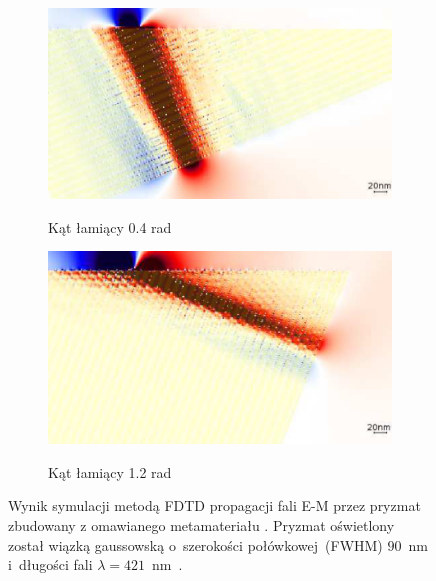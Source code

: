 \begin{figure}[btH]
	\centering
			\begin{subfigure}{0.45\textwidth}
				\includegraphics[width=\textwidth]{images/multilayer/prism04.png} \\
				\caption{Kąt łamiący 0.4 rad}
			\end{subfigure}
			\begin{subfigure}{0.45\textwidth}
				\includegraphics[width=\textwidth]{images/multilayer/prism12.png}\\
				\caption{Kąt łamiący 1.2 rad}
			\end{subfigure}
	\caption{Wynik symulacji metodą FDTD propagacji fali E-M przez pryzmat zbudowany z omawianego metamateriału . Pryzmat oświetlony został wiązką gaussowską o~szerokości połówkowej~(FWHM) $90$~nm i~długości fali $\lambda=421$~nm~\cite{prism2010}.}
\end{figure}

